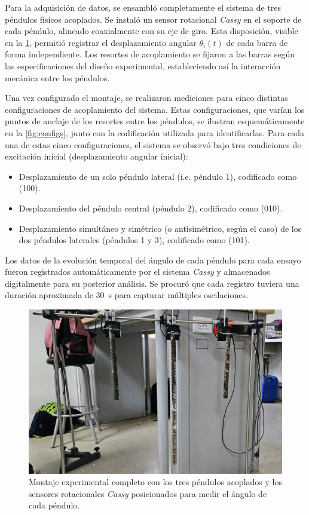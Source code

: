 
Para la adquisición de datos, se ensambló completamente el sistema de
tres péndulos físicos acoplados. Se instaló un sensor rotacional
\emph{Cassy} en el soporte de cada péndulo, alineado coaxialmente con su
eje de giro. Esta disposición, visible en la \cref{fig:set-up},
permitió registrar el desplazamiento angular \(\theta_i(t)\) de cada
barra de forma independiente. Los resortes de acoplamiento se fijaron
a las barras según las especificaciones del diseño experimental,
estableciendo así la interacción mecánica entre los péndulos.

Una vez configurado el montaje, se realizaron mediciones para cinco
distintas configuraciones de acoplamiento del sistema. Estas
configuraciones, que varían los puntos de anclaje de los resortes
entre los péndulos, se ilustran esquemáticamente en la
\cref{fig:configs}, junto con la codificación utilizada para
identificarlas. Para cada una de estas cinco configuraciones,
el sistema se observó bajo tres condiciones de excitación inicial
(desplazamiento angular inicial):
\begin{itemize}
	\item Desplazamiento de un solo péndulo lateral (i.e. péndulo 1),
		codificado como (100).
	\item Desplazamiento del péndulo central (péndulo 2), codificado
		como (010).
	\item Desplazamiento simultáneo y simétrico (o antisimétrico,
		según el caso) de los dos péndulos laterales (péndulos 1 y 3),
		codificado como (101).
\end{itemize}
Los datos de la evolución temporal del ángulo de cada péndulo para
cada ensayo fueron registrados automáticamente por el sistema \emph{Cassy}
y almacenados digitalmente para su posterior análisis. Se procuró
que cada registro tuviera una duración aproximada de
\qty{30}{\second} para capturar múltiples oscilaciones.

\begin{figure}[htbp!]
	\centering
	\includegraphics[width=0.6\linewidth]{./Figures/set-up.jpeg}
	\caption{Montaje experimental completo con los tres péndulos
		acoplados y los sensores rotacionales \emph{Cassy} posicionados para
	medir el ángulo de cada péndulo.}
	\label{fig:set-up}
\end{figure}

